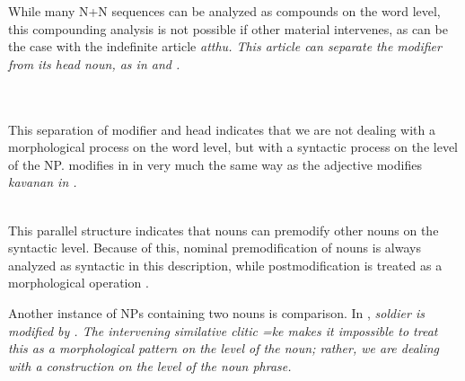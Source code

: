 While many N+N sequences can be analyzed as compounds on the  word level, this compounding analysis is not possible if other material intervenes, as can be the case with the indefinite article \em atthu\em. This article can separate the modifier from its head noun, as in  and .

\\

\\

This separation of modifier and head indicates that we are not dealing with a morphological process on the word level, but with a syntactic process on the level of the NP.  modifies  in  in  very much the same way as the adjective  modifies \em kavanan \em in .


\\

This parallel structure indicates that nouns can premodify other nouns on the syntactic level. Because of this, nominal premodification of nouns is always analyzed as syntactic in this description, while postmodification is treated as a morphological operation .


%
%
Another instance of NPs containing two nouns is comparison. In , \em soldier \em is modified by . The intervening similative clitic \em =ke \em makes it impossible to treat this as a morphological pattern on the level of the noun; rather, we are dealing with a construction on the level of the noun phrase.


